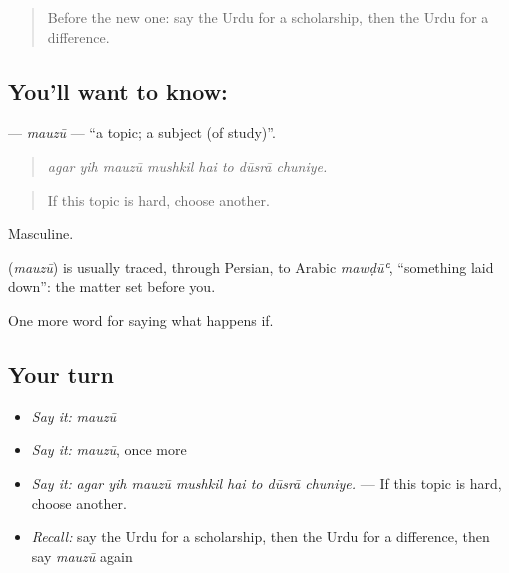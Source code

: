 \label{lesson:UR-C385-mauzu}



\begin{quote}
Before the new one: say the Urdu for a scholarship, then the Urdu for a difference.
\end{quote}

\subsection*{You'll want to know: }
\textbf{} — \emph{mauzū} — \textquotedblleft{}a topic; a subject (of study)\textquotedblright{}.

\begin{quote}
       
\end{quote}

\begin{quote}
\emph{agar yih mauzū mushkil hai to dūsrā chuniye.}
\end{quote}

\begin{quote}
If this topic is hard, choose another.
\end{quote}

Masculine.

\begin{cousinweb}
\textbf{} (\emph{mauzū}) is usually traced, through Persian, to Arabic \emph{mawḍūʿ}, \textquotedblleft{}something laid down\textquotedblright{}: the matter set before you.
\end{cousinweb}

\begin{grammarlens}[title={What you've built}]
One more word for saying what happens if.
\end{grammarlens}

\subsection*{Your turn}
\begin{itemize}
\raggedright
  \item \emph{Say it:} \emph{mauzū}
  \item \emph{Say it:} \emph{mauzū}, once more
  \item \emph{Say it:} \emph{agar yih mauzū mushkil hai to dūsrā chuniye.} — If this topic is hard, choose another.
  \item \emph{Recall:} say the Urdu for a scholarship, then the Urdu for a difference, then say \emph{mauzū} again
\end{itemize}

